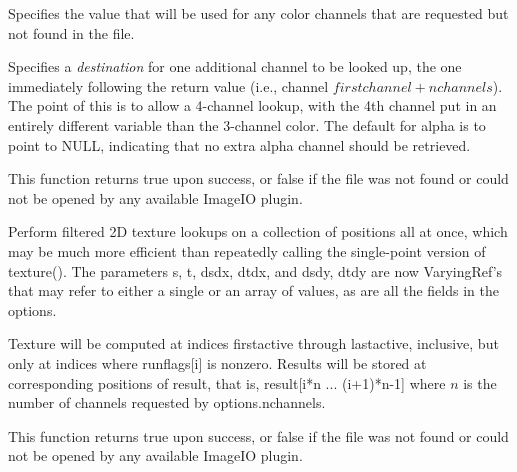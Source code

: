 \vspace{-24pt}
\vspace{10pt}
Specifies the value that will be used for any color channels that are
requested but not found in the file.
\apiend

\vspace{-24pt}
\vspace{10pt}
Specifies a \emph{destination} for one additional channel to be looked
up, the one immediately following the return value (i.e., channel
$\mathit{firstchannel}+\mathit{nchannels}$).  The point of this is to
allow a 4-channel lookup, with the 4th channel put in an entirely
different variable than the 3-channel color.  The default for {\cf
  alpha} is to point to NULL, indicating that no extra alpha channel
should be retrieved.
\apiend

This function returns {\cf true} upon success, or {\cf false} if the
file was not found or could not be opened by any available ImageIO
plugin.
\apiend



Perform filtered 2D texture lookups on a collection of positions all at
once, which may be much more efficient than repeatedly calling the
single-point version of {\cf texture()}.  The parameters {\cf s},
{\cf t}, {\cf dsdx}, {\cf dtdx}, and {\cf dsdy}, {\cf dtdy} are now
{\cf VaryingRef}'s that may refer to either a single or an array of
values, as are all the fields in the {\cf options}.

Texture will be computed at indices {\cf firstactive} through
{\cf lastactive}, inclusive, but only at indices where {\cf runflags[i]}
is nonzero.  Results will be stored at corresponding positions of
{\cf result}, that is, 
{\cf result[i*n ... (i+1)*n-1]} where $n$ is the number of channels
requested by {\cf options.nchannels}.

This function returns {\cf true} upon success, or {\cf false} if the
file was not found or could not be opened by any available ImageIO
plugin.
\apiend

